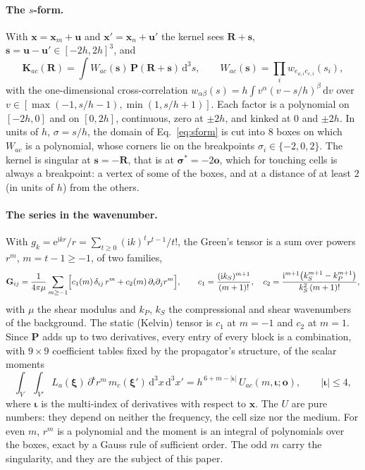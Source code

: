 \documentclass[11pt,a4paper]{article}
\newcommand{\bK}{\mathbf{K}}
\newcommand{\bP}{\mathbf{P}}
\newcommand{\bG}{\mathbf{G}}
\newcommand{\bR}{\mathbf{R}}
\newcommand{\bs}{\mathbf{s}}
\newcommand{\bu}{\mathbf{u}}
\newcommand{\bo}{\mathbf{o}}
\newcommand{\biota}{\boldsymbol{\iota}}
\newcommand{\bxi}{\boldsymbol{\xi}}
\newcommand{\dd}{\mathrm{d}}
\begin{document}
\paragraph{The $s$-form.} With $\mathbf{x}=\mathbf{x}_m+\bu$ and $\mathbf{x}'=\mathbf{x}_n+\bu'$ the kernel
sees $\bR+\bs$, $\bs=\bu-\bu'\in[-2h,2h]^3$, and
\begin{equation}\label{eq:sform}
  \bK_{ac}(\bR)=\int W_{ac}(\bs)\,\bP(\bR+\bs)\,\dd^3s,\qquad W_{ac}(\bs)=\prod_iw_{e_{a,i}e_{c,i}}(s_i),
\end{equation}
with the one-dimensional cross-correlation $w_{\alpha\beta}(s)=h\int v^\alpha(v-s/h)^\beta\,\dd v$ over
$v\in[\max(-1,s/h-1),\min(1,s/h+1)]$. Each factor is a polynomial on $[-2h,0]$ and on $[0,2h]$, continuous,
zero at $\pm2h$, and kinked at $0$ and $\pm2h$. In units of $h$, $\sigma=s/h$, the domain of
Eq.~\eqref{eq:sform} is cut into $8$ boxes on which $W_{ac}$ is a polynomial, whose corners lie on the
breakpoints $\sigma_i\in\{-2,0,2\}$. The kernel is singular at $\bs=-\bR$, that is at
$\boldsymbol\sigma^*=-2\bo$, which for touching cells is always a breakpoint: a vertex of some of the boxes,
and at a distance of at least $2$ (in units of $h$) from the others.

\paragraph{The series in the wavenumber.} With $g_k=\mathrm{e}^{\mathrm{i}kr}/r=\sum_{t\ge0}
(\mathrm{i}k)^tr^{t-1}/t!$, the Green's tensor is a sum over powers $r^m$, $m=t-1\ge-1$, of two families,
\begin{equation}\label{eq:series}
  \bG_{ij}=\frac{1}{4\pi\mu}\sum_{m\ge-1}\Bigl[c_1(m)\,\delta_{ij}\,r^m+c_2(m)\,\partial_i\partial_jr^m\Bigr],
  \qquad c_1=\frac{(\mathrm{i}k_S)^{m+1}}{(m+1)!},\quad
  c_2=\frac{\mathrm{i}^{m+1}\bigl(k_S^{m+1}-k_P^{m+1}\bigr)}{k_S^2\,(m+1)!},
\end{equation}
with $\mu$ the shear modulus and $k_P$, $k_S$ the compressional and shear wavenumbers of the background.
The static (Kelvin) tensor is $c_1$ at $m=-1$ and $c_2$ at $m=1$. Since $\bP$ adds up to two derivatives,
every entry of every block is a combination, with $9\times9$ coefficient tables fixed by the propagator's
structure, of the scalar moments
\begin{equation}\label{eq:umoment}
  \int_{V}\!\int_{V'}L_a(\bxi)\,\partial^{\biota}r^m\,m_c(\bxi')\,\dd^3x\,\dd^3x'
  =h^{\,6+m-|\biota|}\,U_{ac}(m,\biota;\bo),\qquad|\biota|\le4,
\end{equation}
where $\biota$ is the multi-index of derivatives with respect to $\mathbf{x}$. The $U$ are pure numbers:
they depend on neither the frequency, the cell size nor the medium. For even $m$, $r^m$ is a polynomial
and the moment is an integral of polynomials over the boxes, exact by a Gauss rule of sufficient order.
The odd $m$ carry the singularity, and they are the subject of this paper.
\end{document}

